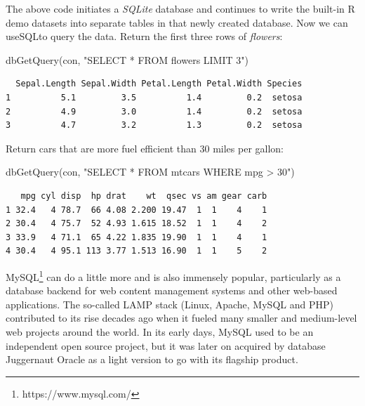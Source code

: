 \documentclass[
  12pt,
  letterpaper,
]{krantz}
\newenvironment{Shaded}{\begin{snugshade}}{\end{snugshade}}
\newcommand{\FunctionTok}[1]{\textcolor[rgb]{0.28,0.35,0.67}{#1}}
\newcommand{\NormalTok}[1]{\textcolor[rgb]{0.00,0.23,0.31}{#1}}
\newcommand{\StringTok}[1]{\textcolor[rgb]{0.13,0.47,0.30}{#1}}
\begin{document}
\normalsize

The above code initiates a \emph{SQLite}
database and continues to write the built-in R demo
datasets into separate tables in that newly created
database. Now we can useSQLto query the data.
Return the first three rows of \emph{flowers}:

\scriptsize

\begin{Shaded}
\begin{Highlighting}[]
\FunctionTok{dbGetQuery}\NormalTok{(con, }\StringTok{"SELECT * FROM flowers LIMIT 3"}\NormalTok{)}
\end{Highlighting}
\end{Shaded}

\begin{verbatim}
  Sepal.Length Sepal.Width Petal.Length Petal.Width Species
1          5.1         3.5          1.4         0.2  setosa
2          4.9         3.0          1.4         0.2  setosa
3          4.7         3.2          1.3         0.2  setosa
\end{verbatim}

\normalsize

Return cars that are more fuel efficient than 30 miles per gallon:

\scriptsize

\begin{Shaded}
\begin{Highlighting}[]
\FunctionTok{dbGetQuery}\NormalTok{(con, }\StringTok{"SELECT * FROM mtcars WHERE mpg \textgreater{} 30"}\NormalTok{)}
\end{Highlighting}
\end{Shaded}

\begin{verbatim}
   mpg cyl disp  hp drat    wt  qsec vs am gear carb
1 32.4   4 78.7  66 4.08 2.200 19.47  1  1    4    1
2 30.4   4 75.7  52 4.93 1.615 18.52  1  1    4    2
3 33.9   4 71.1  65 4.22 1.835 19.90  1  1    4    1
4 30.4   4 95.1 113 3.77 1.513 16.90  1  1    5    2
\end{verbatim}

\normalsize

MySQL\footnote{https://www.mysql.com/} can do a little more
and is also immensely popular, particularly as a
database backend for web content management systems and
other web-based applications. The so-called LAMP stack
(Linux, Apache, MySQL and PHP) contributed to its rise decades ago when
it fueled many smaller and medium-level web projects around the world.
In its early days, MySQL used to be an independent open source project,
but it was later on acquired by database Juggernaut
Oracle as a light version to go with its flagship product.
\end{document}
